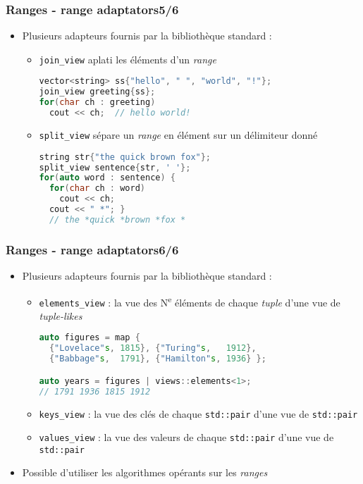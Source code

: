 \documentclass[C++.tex]{subfiles}
\begin{document}
\begin{frame}[fragile]
	\frametitle{Ranges - range adaptators\titlehfill{}5/6}
	\begin{itemize}
		\item Plusieurs adapteurs fournis par la bibliothèque standard :
		\begin{itemize}
			\item \lstinline|join_view| \og aplati\fg{} les éléments d'un \textit{range}

\begin{lstlisting}[language=C++]
vector<string> ss{"hello", " ", "world", "!"};
join_view greeting{ss};
for(char ch : greeting)
  cout << ch;  // hello world!\end{lstlisting}

			\item \lstinline|split_view| sépare un \textit{range} en élément sur un délimiteur donné
			
			\begin{lstlisting}[language=C++]
string str{"the quick brown fox"};
split_view sentence{str, ' '};
for(auto word : sentence) {
  for(char ch : word)
    cout << ch;
  cout << " *"; }
  // the *quick *brown *fox *\end{lstlisting}

		\end{itemize}
	\end{itemize}
\end{frame}

\begin{frame}[fragile]
	\frametitle{Ranges - range adaptators\titlehfill{}6/6}
	\begin{itemize}
		\item Plusieurs adapteurs fournis par la bibliothèque standard :
		\begin{itemize}
			\item \lstinline|elements_view| : la vue des N\textsuperscript{e} éléments de chaque \textit{tuple} d'une vue de \textit{tuple-likes}

			\begin{lstlisting}[language=C++]
auto figures = map {
  {"Lovelace"s, 1815}, {"Turing"s,   1912},
  {"Babbage"s,  1791}, {"Hamilton"s, 1936} };

auto years = figures | views::elements<1>;
// 1791 1936 1815 1912\end{lstlisting}

			\item \lstinline|keys_view| : la vue des clés de chaque \lstinline|std::pair| d'une vue de \lstinline|std::pair|
			\item \lstinline|values_view| : la vue des valeurs de chaque \lstinline|std::pair| d'une vue de \lstinline|std::pair|
		\end{itemize}
	\item Possible d'utiliser les algorithmes opérants sur les \textit{ranges}
	\end{itemize}
\end{frame}
\end{document}
